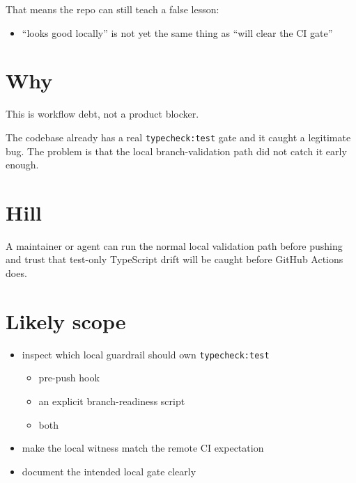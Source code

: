 That means the repo can still teach a false lesson:

\begin{itemize}
\tightlist
\item
  ``looks good locally'' is not yet the same thing as ``will clear the CI gate''
\end{itemize}

\section{Why}\label{record-405-why}

This is workflow debt, not a product blocker.

The codebase already has a real \texttt{t\allowbreak{}y\allowbreak{}p\allowbreak{}e\allowbreak{}c\allowbreak{}h\allowbreak{}e\allowbreak{}c\allowbreak{}k\allowbreak{}:\allowbreak{}t\allowbreak{}e\allowbreak{}s\allowbreak{}t} gate and it caught a legitimate bug. The problem is that the local branch-validation path did not catch it early enough.

\section{Hill}\label{record-405-hill}

A maintainer or agent can run the normal local validation path before pushing and trust that test-only TypeScript drift will be caught before GitHub Actions does.

\section{Likely scope}\label{record-405-likely-scope}

\begin{itemize}
\tightlist
\item
  inspect which local guardrail should own \texttt{t\allowbreak{}y\allowbreak{}p\allowbreak{}e\allowbreak{}c\allowbreak{}h\allowbreak{}e\allowbreak{}c\allowbreak{}k\allowbreak{}:\allowbreak{}t\allowbreak{}e\allowbreak{}s\allowbreak{}t}

  \begin{itemize}
  \tightlist
  \item
    pre-push hook
  \item
    an explicit branch-readiness script
  \item
    both
  \end{itemize}
\item
  make the local witness match the remote CI expectation
\item
  document the intended local gate clearly
\end{itemize}

